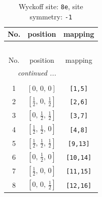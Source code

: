 \documentclass[fleqn,8pt]{jsarticle}
\begin{document}
\renewcommand{\arraystretch}{1.2}
\begin{longtable}{ccc}
\caption{Wyckoff site: {\tt 8e}, site symmetry: {\tt -1}}
 \\
 \hline \hline
No. & position & mapping \\ \hline \endfirsthead

\multicolumn{2}{l}{\tablename\ \thetable{}} \\
 \hline \hline
No. & position & mapping \\ \hline \endhead

 \hline \hline
\multicolumn{2}{r}{\footnotesize\it continued ...} \\ \endfoot

 \hline \hline
\multicolumn{2}{r}{} \\ \endlastfoot

1 & $\left[ 0,\, 0,\, 0 \right]$ & {\tt [1,5]} \\ \hline
2 & $\left[ \frac{1}{2},\, 0,\, \frac{1}{2} \right]$ & {\tt [2,6]} \\ \hline
3 & $\left[ 0,\, \frac{1}{2},\, \frac{1}{2} \right]$ & {\tt [3,7]} \\ \hline
4 & $\left[ \frac{1}{2},\, \frac{1}{2},\, 0 \right]$ & {\tt [4,8]} \\ \hline
5 & $\left[ \frac{1}{2},\, \frac{1}{2},\, \frac{1}{2} \right]$ & {\tt [9,13]} \\ \hline
6 & $\left[ 0,\, \frac{1}{2},\, 0 \right]$ & {\tt [10,14]} \\ \hline
7 & $\left[ \frac{1}{2},\, 0,\, 0 \right]$ & {\tt [11,15]} \\ \hline
8 & $\left[ 0,\, 0,\, \frac{1}{2} \right]$ & {\tt [12,16]} \\
\end{longtable}
\renewcommand{\arraystretch}{1.2}
\end{document}
